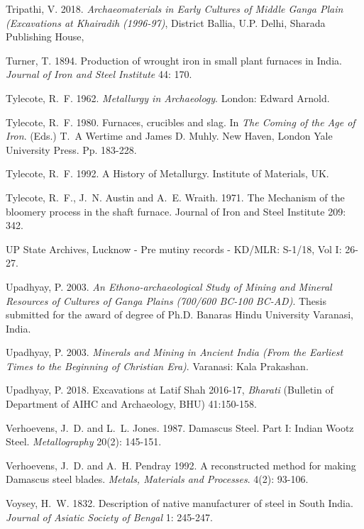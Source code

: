 \begin{thebibliography}{99}
 Tripathi, V. 2018. \textit{Archaeomaterials in Early Cultures of Middle Ganga Plain (Excavations at Khairadih (1996-97)}, District Ballia, U.P. Delhi, Sharada Publishing House, 
 
 Turner, T. 1894. Production of wrought iron in small plant furnaces in India. \textit{Journal of Iron and Steel Institute} 44: 170. 

 Tylecote, R.~F. 1962. \textit{Metallurgy in Archaeology}. London: Edward Arnold. 

 Tylecote, R.~F. 1980. Furnaces, crucibles and slag. In \textit{The Coming of the Age of Iron}. (Eds.) T.~A Wertime and James D. Muhly. New Haven, London Yale University Press. Pp. 183-228.

 Tylecote, R.~F. 1992. A History of Metallurgy. Institute of Materials, UK.

 Tylecote, R.~F., J.~N. Austin and A.~E. Wraith. 1971. The Mechanism of the bloomery process in the shaft furnace. Journal of Iron and Steel Institute 209: 342.

 UP State Archives, Lucknow - Pre mutiny records - KD/MLR: S-1/18, Vol I: 26-27. 

 Upadhyay, P. 2003. \textit{An Ethono-archaeological Study of Mining and Mineral Resources of Cultures of Ganga Plains (700/600 BC-100 BC-AD)}. Thesis submitted for the award of degree of Ph.D. Banaras Hindu University Varanasi, India.

 Upadhyay, P. 2003. \textit{Minerals and Mining in Ancient India (From the Earliest Times to the Beginning of Christian Era)}. Varanasi: Kala Prakashan.

 Upadhyay, P. 2018. Excavations at Latif Shah 2016-17, \textit{Bharati} (Bulletin of Department of AIHC and Archaeology, BHU) 41:150-158.

 Verhoevens, J.~D. and L.~L. Jones. 1987. Damascus Steel. Part I: Indian Wootz Steel. \textit{Metallography} 20(2): 145-151.

 Verhoevens, J.~D. and A.~H. Pendray 1992. A reconstructed method for making Damascus steel blades. \textit{Metals, Materials and Processes}. 4(2): 93-106.

 Voysey, H.~W. 1832. Description of native manufacturer of steel in South India. \textit{Journal of Asiatic Society of Bengal} 1: 245-247.


\end{thebibliography}
